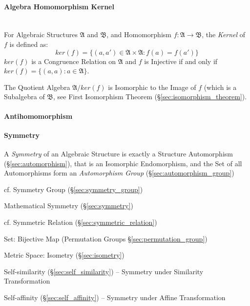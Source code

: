 \paragraph{Algebra Homomorphism Kernel}\hfill
\label{sec:algebra_homomorphism_kernel} \hfill \\

For Algebraic Structures $\mathfrak{A}$ and $\mathfrak{B}$, and Homomorphism
$f: \mathfrak{A} \rightarrow \mathfrak{B}$, the \emph{Kernel} of $f$ is defined
as:
\[
    ker(f) = \{ (a,a') \in \mathfrak{A} \times \mathfrak{A} : f(a) = f(a') \}
\]
$ker(f)$ is a Congruence Relation on $\mathfrak{A}$ and $f$ is Injective if and
only if $ker(f) = \{(a,a) : a \in \mathfrak{A}\}$.

The Quotient Algebra $\mathfrak{A}/ker(f)$ is Isomorphic to the Image of $f$
(which is a Subalgebra of $\mathfrak{B}$, see First Isomorphism Theorem
(\S\ref{sec:isomorphism_theorem}).



\paragraph{Antihomomorphism}\label{sec:antihomomorphism}\hfill

\paragraph{Symmetry}\label{sec:structure_symmetry}\hfill

A \emph{Symmetry} of an Algebraic Structure is exactly a Structure Automorphism
(\S\ref{sec:automorphism}), that is an Isomorphic Endomorphism, and the Set of
all Automorphisms form an \emph{Automorphism Group}
(\S\ref{sec:automorphism_group})

cf. Symmetry Group (\S\ref{sec:symmetry_group})

\fist Mathematical Symmetry (\S\ref{sec:symmetry})

\fist cf. Symmetric Relation (\S\ref{sec:symmetric_relation})

Set: Bijective Map (Permutation Groups \S\ref{sec:permutation_group})

Metric Space: Isometry (\S\ref{sec:isometry})

Self-similarity (\S\ref{sec:self_similarity}) -- Symmetry under Similarity
Transformation

Self-affinity (\S\ref{sec:self_affinity}) -- Symmetry under Affine
Transformation



